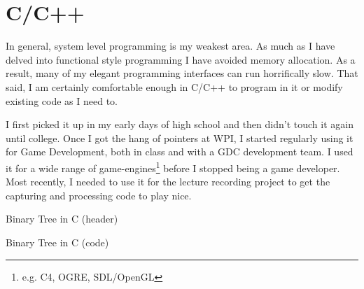 \section{C/C++}


In general, system level programming is my weakest area. As much as I
have delved into functional style programming I have avoided memory
allocation. As a result, many of my elegant programming interfaces can
run horrifically slow. That said, I am certainly comfortable enough in
C/C++ to program in it or modify existing code as I need to.

I first picked it up in my early days of high school and then didn't touch it
again until college.  Once I got the hang of pointers at WPI, I started
regularly using it for Game Development, both in class and with a GDC
development team.  I used it for a wide range of game-engines\footnote{e.g. C4,
OGRE, SDL/OpenGL} before I stopped being a game developer.  Most recently, I
needed to use it for the lecture recording project to get the capturing and
processing code to play nice.

{Binary Tree in C (header)}

{Binary Tree in C (code)}
